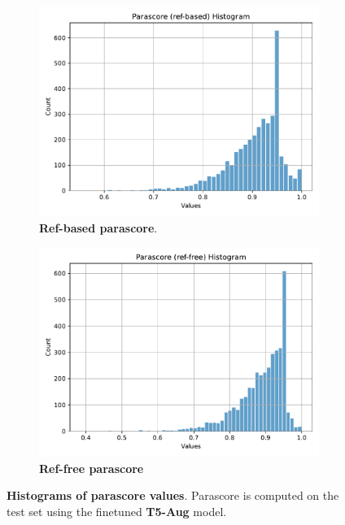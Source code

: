 \documentclass[fleqn,moreauthors,10pt]{ds_report}
\begin{document}
\begin{figure}[ht]
    \centering
    \begin{subfigure}{0.45\linewidth} %
        \centering
        \includegraphics[width=\textwidth]{t5-aug-parascore-ref-based-hist.pdf}
        \caption{\textbf{Ref-based parascore}.}
        \label{fig:t5-aug-parascore-ref-based-hist}
    \end{subfigure}
    \hfill %
    \begin{subfigure}{0.45\linewidth} %
        \centering
        \includegraphics[width=\textwidth]{t5-aug-parascore-ref-free-hist.pdf}
        \caption{\textbf{Ref-free parascore}}
        \label{fig:t5-aug-parascore-ref-free-hist}
    \end{subfigure}
    \caption{\textbf{Histograms of parascore values}. Parascore is computed on the test set using the finetuned \textbf{T5-Aug} model.}
    \label{fig:t5-parascore-hist}
\end{figure}
\end{document}
